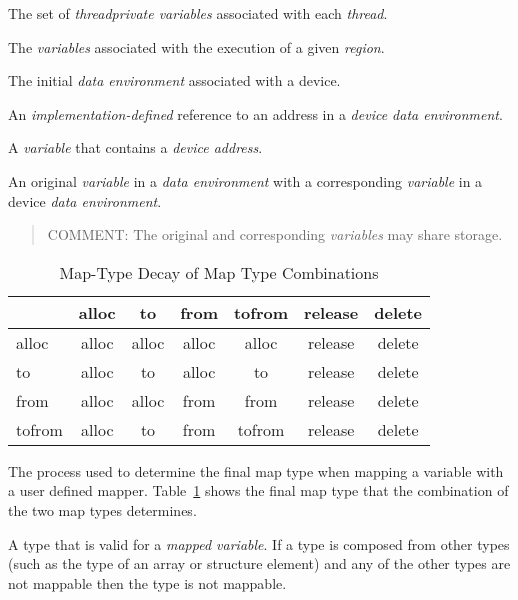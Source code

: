 \glossarydefstart
The set of \emph{threadprivate variables} associated with each \emph{thread}.
\glossarydefend

\glossarydefstart
The \emph{variables} associated with the execution of a given \emph{region}.
\glossarydefend

\glossarydefstart
The initial \emph{data environment} associated with a device.
\glossarydefend
\bigskip

\glossarydefstart
An \emph{implementation-defined} reference to an address in a 
\emph{device data environment}.
\glossarydefend

\glossarydefstart
A \emph{variable} that contains a \emph{device address}.
\glossarydefend


\glossarydefstart
An original \emph{variable} in a \emph{data environment} with a corresponding 
\emph{variable} in a device \emph{data environment}.

\begin{quote}
COMMENT: The original and corresponding \emph{variables} may share storage.
\end{quote}
\glossarydefend

\begin{table}[b]
\centering
\caption{Map-Type Decay of Map Type Combinations\label{tab:map-type_decay}}
\begin{tabular}{l|c|c|c|c|c|c}
  & alloc & to    & from  & tofrom & release & delete \\
  \hline
alloc  & alloc & alloc & alloc & alloc  & release & delete \\
to     & alloc & to    & alloc & to     & release & delete \\
from   & alloc & alloc & from  & from   & release & delete \\
tofrom & alloc & to    & from  & tofrom & release & delete \\
\end{tabular}
\end{table}

\glossarydefstart
The process used to determine the final map type when mapping a variable
with a user defined mapper. Table~\ref{tab:map-type_decay} shows the final 
map type that the combination of the two map types determines.
\glossarydefend

\glossarydefstart
A type that is valid for a \emph{mapped variable}. If a type is composed 
from other types (such as the type of an array or structure element) and 
any of the other types are not mappable then the type is not mappable.


